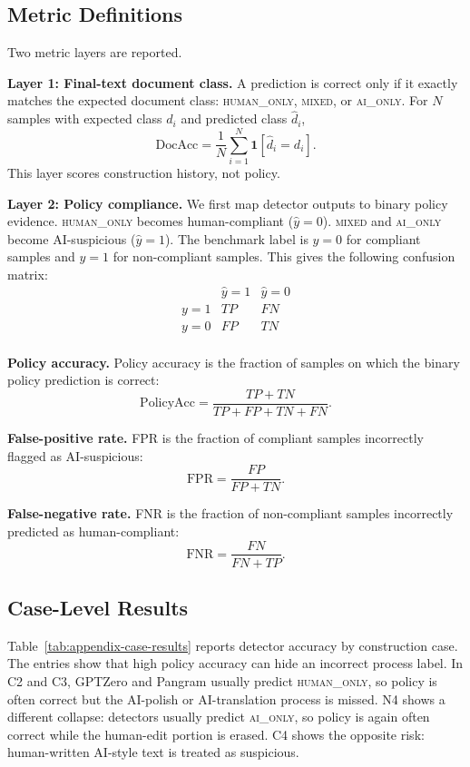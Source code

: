 \documentclass[11pt]{article}
\begin{document}
\subsection{Metric Definitions}

Two metric layers are reported.

\noindent\textbf{Layer 1: Final-text document class.} A prediction is correct only if it exactly matches the expected document class: \textsc{human\_only}, \textsc{mixed}, or \textsc{ai\_only}. For \(N\) samples with expected class \(d_i\) and predicted class \(\hat{d}_i\),
\[
\mathrm{DocAcc}=\frac{1}{N}\sum_{i=1}^{N}\mathbf{1}[\hat{d}_i=d_i].
\]
This layer scores construction history, not policy.

\noindent\textbf{Layer 2: Policy compliance.}
We first map detector outputs to binary policy evidence.
\textsc{human\_only} becomes human-compliant (\(\hat{y}=0\)).
\textsc{mixed} and \textsc{ai\_only} become AI-suspicious (\(\hat{y}=1\)).
The benchmark label is \(y=0\) for compliant samples and \(y=1\) for non-compliant samples.
This gives the following confusion matrix:
\[
\begin{array}{c|cc}
 & \hat{y}=1 & \hat{y}=0 \\
\hline
y=1 & TP & FN \\
y=0 & FP & TN \\
\end{array}
\]

\noindent\textbf{Policy accuracy.} Policy accuracy is the fraction of samples on which the binary policy prediction is correct:
\[
\mathrm{PolicyAcc}=\frac{TP+TN}{TP+FP+TN+FN}.
\]

\noindent\textbf{False-positive rate.} FPR is the fraction of compliant samples incorrectly flagged as AI-suspicious:
\[
\mathrm{FPR}=\frac{FP}{FP+TN}.
\]

\noindent\textbf{False-negative rate.} FNR is the fraction of non-compliant samples incorrectly predicted as human-compliant:
\[
\mathrm{FNR}=\frac{FN}{FN+TP}.
\]

\subsection{Case-Level Results}

Table~\ref{tab:appendix-case-results} reports detector accuracy by construction case. The entries show that high policy accuracy can hide an incorrect process label. In C2 and C3, GPTZero and Pangram usually predict \textsc{human\_only}, so policy is often correct but the AI-polish or AI-translation process is missed. N4 shows a different collapse: detectors usually predict \textsc{ai\_only}, so policy is again often correct while the human-edit portion is erased. C4 shows the opposite risk: human-written AI-style text is treated as suspicious.
\end{document}
